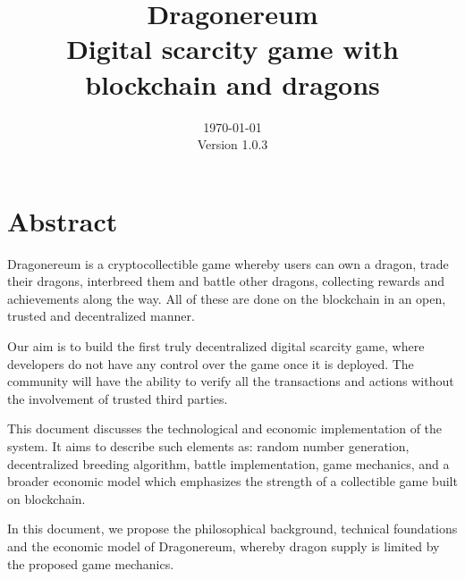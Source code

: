 \documentclass[12pt]{article}
\title{ \vspace{8cm}
        Dragonereum \\
		\normalsize Digital scarcity game with blockchain and dragons}
\date{\vspace{10.5cm}
        \today \\	
		\small Version 1.0.3}
\begin{document}
\sloppy %

\maketitle
\setlength{\parskip}{9.96pt}
 \par


\vspace{\baselineskip}

\vspace{\baselineskip}

\vspace{\baselineskip}
 \par

 \par

 \par



\section*{Abstract}
Dragonereum is a cryptocollectible game whereby users can own a dragon, trade their dragons, interbreed them and battle other dragons, collecting rewards and achievements along the way. All of these are done on the blockchain in an open, trusted and decentralized manner.\par

Our aim is to build the first truly decentralized digital scarcity game, where developers do not have any control over the game once it is deployed. The community will have the ability to verify all the transactions and actions without the involvement of trusted third parties.\par

This document discusses the technological and economic implementation of the system. It aims to describe such elements as: random number generation, decentralized breeding algorithm, battle implementation, game mechanics, and a broader economic model which emphasizes the strength of a collectible game built on blockchain.\par

In this document, we propose the philosophical background, technical foundations and the economic model of Dragonereum, whereby dragon supply is limited by the proposed game mechanics.%

\end{document}
